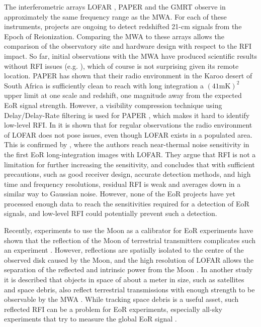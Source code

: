 \documentclass{pasa}
\begin{document}
The interferometric arrays LOFAR \citep{lofar-2013}, PAPER \citep{parsons-paper-eorlimit-2014} and the GMRT \citep{the-gmrt-swarup-chapter-2013} observe in approximately the same frequency range as the MWA. For each of these instruments, projects are ongoing to detect redshifted 21-cm signals from the Epoch of Reionization. Comparing the MWA to these arrays allows the comparison of the observatory site and hardware design with respect to the RFI impact. So far, initial observations with the MWA have produced scientific results without RFI issues (e.g. \citealt{mwacs-2014}), which of course is not surprising given its remote location. PAPER has shown that their radio environment in the Karoo desert of South Africa is sufficiently clean to reach with long integration a $(41 \textrm{mK})^2$ upper limit at one scale and redshift, one magnitude away from the expected EoR signal strength. However, a visibility compression technique using Delay/Delay-Rate filtering is used for PAPER \citep{parsons-paper-eorlimit-2014}, which makes it hard to identify low-level RFI. In \citet{lofar-radio-environment} it is shown that for regular observations the radio environment of LOFAR does not pose issues, even though LOFAR exists in a populated area. This is confirmed by \citet{ncp-eor-yatawatta}, where the authors reach near-thermal noise sensitivity in the first EoR long-integration images with LOFAR. They argue that RFI is not a limitation for further increasing the sensitivity, and \citet{offringa-rfi-distributions} concludes that with sufficient precautions, such as good receiver design, accurate detection methods, and high time and frequency resolutions, residual RFI is weak and averages down in a similar way to Gaussian noise. However, none of the EoR projects have yet processed enough data to reach the sensitivities required for a detection of EoR signals, and low-level RFI could potentially prevent such a detection.

Recently, experiments to use the Moon as a calibrator for EoR experiments have shown that the reflection of the Moon of terrestrial transmitters complicates such an experiment \citep{mckinley-moon-2013}. However, reflections are spatially isolated to the centre of the observed disk caused by the Moon, and the high resolution of LOFAR allows the separation of the reflected and intrinsic power from the Moon \citep{vedantham-2014-todo}. In another study it is described that objects in space of about a meter in size, such as satellites and space debris, also reflect terrestrial transmissions with enough strength to be observable by the MWA \citep{tingay-space-debris-2013}. While tracking space debris is a useful asset, such reflected RFI can be a problem for EoR experiments, especially all-sky experiments that try to measure the global EoR signal \citep{vedantham-2014-todo}.
\end{document}
